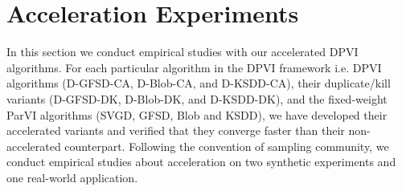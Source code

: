 
\section{Acceleration Experiments}

In this section we conduct empirical studies with our accelerated DPVI algorithms.
For each particular algorithm in the DPVI framework i.e.
DPVI algorithms (D-GFSD-CA, D-Blob-CA, and D-KSDD-CA),
their duplicate/kill variants (D-GFSD-DK, D-Blob-DK,
and D-KSDD-DK), and the fixed-weight ParVI algorithms
(SVGD, GFSD, Blob and KSDD),
we have developed their accelerated variants and verified that they converge faster than their non-accelerated counterpart.
Following the convention of sampling community, 
we conduct empirical studies about acceleration on two synthetic experiments and one real-world application.